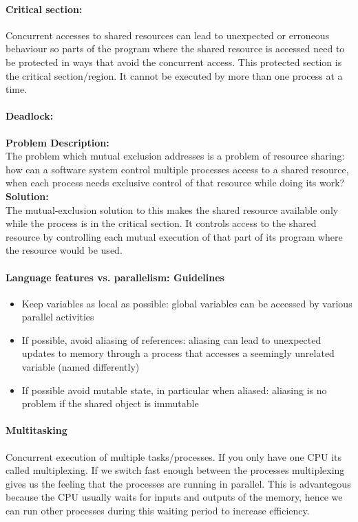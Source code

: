 \documentclass[8pt]{extreport}
\begin{document}
\paragraph{Critical section:\\}
Concurrent accesses to shared resources can lead to unexpected or erroneous behaviour so parts of the program where the shared resource is  accessed need to be protected in ways that avoid the concurrent access. This protected section is the critical section/region. It cannot be executed by more than one process at a time.
\paragraph{Deadlock:\\}

\textbf{Problem Description:\\}
The problem which mutual exclusion addresses is a problem of resource sharing: how can a software system control multiple processes access to a shared resource, when each process needs exclusive control of that resource while doing its work?\\
\textbf{Solution:\\}
The mutual-exclusion solution to this makes the shared resource available only while the process is in the critical section. It controls access to the shared resource by controlling each mutual execution of that part of its program where the resource would be used.

\paragraph{Language features vs. parallelism: Guidelines}
\begin{itemize}
\item Keep variables as local as possible: global variables can be accessed by various parallel activities
\item If possible, avoid aliasing of references: aliasing can lead to unexpected updates to memory through a process that accesses a seemingly unrelated variable (named differently)
\item If possible avoid mutable state, in particular when aliased: aliasing is no problem if the shared object is immutable
\end{itemize}

\paragraph{Multitasking}
Concurrent execution of multiple tasks/processes. If you only have one CPU its called multiplexing. If we switch fast enough between the processes multiplexing gives us the feeling that the processes are running in parallel. This is advantegous because the
CPU usually waits for inputs and outputs of the memory, hence we can run other processes during this waiting period to increase efficiency.
\end{document}
